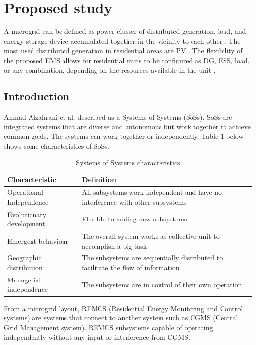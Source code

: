 \section{Proposed study}
A microgrid can be defined as power cluster of distributed generation, load, and energy storage device accumulated together in the vicinity to each other \cite{30}. The most used distributed generation in residential areas are PV \cite{31}. The flexibility of the proposed EMS allows for residential units to be configured as DG, ESS, load, or any combination, depending on the resources available in the unit \cite{32}.\par
\subsection{Introduction}
Ahmad Alzahrani et al. \cite{32} described as a Systems of Systems (SoSs). SoSs are integrated systems that are diverse and autonomous but work together to achieve common goals. The systems can work together or independently. Table 1 below shows some characteristics of SoSs.
	\begin{table}[!ht]
		\begin{center}
			\caption{Systems of Systems characteristics}
			\begin{tabular}{|p{6cm}|p{8cm}|} %
				\hline
				\textbf{Characteristic} & \textbf{Definition}\\
				\hline
				Operational Independence & All subsystems work independent and have no interference with other subsystems\\
				\hline
				Evolutionary development & Flexible to adding new subsystems\\
				\hline
				Emergent behaviour & The overall system works as collective unit to accomplish a big task\\
				\hline
				Geographic distribution & The subsystems are sequentially distributed to facilitate the flow of information\\
				\hline
				Managerial independence & The subsystems are in control of their own operation.\\
				\hline
			\end{tabular}
		\end{center}
	\end{table}
	
	From a microgrid layout, REMCS (Residential Energy Monitoring and Control systems) are systems that connect to another system such as CGMS (Central Grid Management system). REMCS subsystems capable of operating independently without any input or interference from CGMS. 
